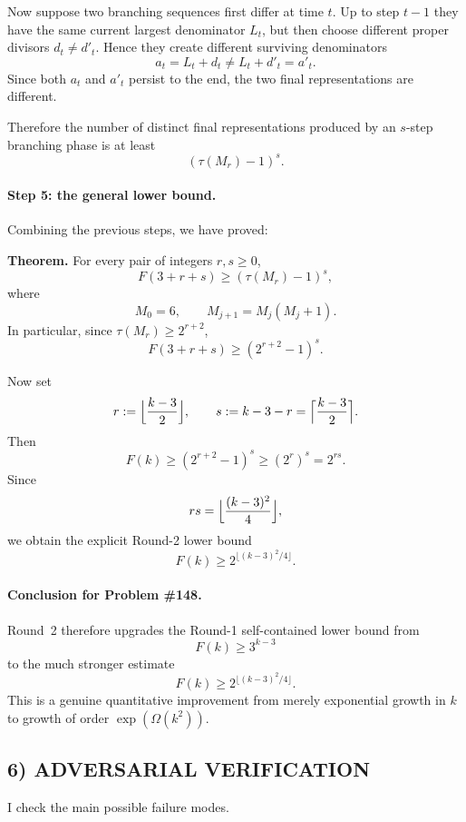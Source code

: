 Now suppose two branching sequences first differ at time $t$. Up to step $t-1$ they have the same current largest denominator $L_t$, but then choose different proper divisors $d_t\neq d'_t$. Hence they create different surviving denominators
\[
a_t=L_t+d_t \neq L_t+d'_t=a'_t.
\]
Since both $a_t$ and $a'_t$ persist to the end, the two final representations are different.

Therefore the number of distinct final representations produced by an $s$-step branching phase is at least
\[
(\tau(M_r)-1)^s.
\]

\paragraph{Step 5: the general lower bound.}
Combining the previous steps, we have proved:

\medskip
\noindent\textbf{Theorem.}
For every pair of integers $r,s\ge 0$,
\[
F(3+r+s)\ge (\tau(M_r)-1)^s,
\]
where
\[
M_0=6,\qquad M_{j+1}=M_j(M_j+1).
\]
In particular, since $\tau(M_r)\ge 2^{r+2}$,
\[
F(3+r+s)\ge (2^{r+2}-1)^s.
\]

\medskip
Now set
\[
r:=\Bigl\lfloor \frac{k-3}{2}\Bigr\rfloor,
\qquad
s:=k-3-r=\Bigl\lceil \frac{k-3}{2}\Bigr\rceil.
\]
Then
\[
F(k)\ge (2^{r+2}-1)^s \ge (2^r)^s = 2^{rs}.
\]
Since
\[
rs=\Bigl\lfloor \frac{(k-3)^2}{4}\Bigr\rfloor,
\]
we obtain the explicit Round-2 lower bound
\[
F(k)\ge 2^{\lfloor (k-3)^2/4\rfloor}.
\]

\paragraph{Conclusion for Problem \#148.}
Round~2 therefore upgrades the Round-1 self-contained lower bound from
\[
F(k)\ge 3^{k-3}
\]
to the much stronger estimate
\[
F(k)\ge 2^{\lfloor (k-3)^2/4\rfloor}.
\]
This is a genuine quantitative improvement from merely exponential growth in $k$ to growth of order $\exp(\Omega(k^2))$.

\subsection*{6) ADVERSARIAL VERIFICATION}
I check the main possible failure modes.

